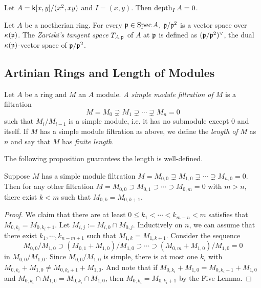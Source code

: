\begin{example}
    Let $A = {\mathsf{k}}[x,y]/(x^2,xy)$ and $I = (x,y)$.
    Then $\operatorname{depth}_I A = 0$.
\end{example}

\begin{definition}\label{def: Zariski's tangent space}
    Let \(A\) be a noetherian ring.
    For every ${\mathfrak{p}} \in \operatorname{Spec} A$, \({\mathfrak{p}}/{\mathfrak{p}}^2\) is a vector space over \({\kappa}({\mathfrak{p}})\).
    The \emph{Zariski's tangent space} $T_{A,{\mathfrak{p}}}$ of \(A\) at \({\mathfrak{p}}\) is defined as \(({\mathfrak{p}}/{\mathfrak{p}}^2)^\lor\), the dual \({\kappa}({\mathfrak{p}})\)-vector space of \({\mathfrak{p}}/{\mathfrak{p}}^2\).
\end{definition}

\subsection{Artinian Rings and Length of Modules}

    \begin{definition}\label{def: length of a module}
        Let $A$ be a ring and $M$ an $A$ module.
        \textit{A simple module filtration of $M$} is a filtration
        \[ M = M_0 \supsetneq M_1 \supsetneq \cdots \supsetneq M_n = 0 \] 
        such that $M_i/M_{i-1}$ is a simple module, i.e. it has no submodule except $0$ and itself.
        If $M$ has a simple module filtration as above, we define the \textit{length of $M$} as $n$ and say that $M$ has \textit{finite length}.
    \end{definition}

    The following proposition guarantees the length is well-defined.

    \begin{proposition}\label{prop: length of a module is well defined}
        Suppose $M$ has a simple module filtration $M = M_{0,0} \supsetneq M_{1,0} \supsetneq \cdots \supsetneq M_{n,0} = 0$.
        Then for any other filtration $M = M_{0,0} \supset M_{0,1} \supset \cdots \supset M_{0,m} = 0$ with $m > n$, there exist $k<m$ such that $M_{0,k} = M_{0,k+1}$.
    \end{proposition}
    \begin{proof}
        We claim that there are at least $0\leq k_1<\cdots<k_{m-n}<m$ satisfies that $M_{0,k_i} = M_{0,k_i+1}$.
        Let $M_{i,j} := M_{i,0} \cap M_{0,j}$.
        Inductively on $n$, we can assume that there exist $k_1,\cdots,k_{n-m+1}$ such that $M_{1,k} = M_{1,k+1}$.
        Consider the sequence 
        \[ M_{0,0}/M_{1,0} \supset (M_{0,1}+M_{1,0})/M_{1,0} \supset \cdots \supset (M_{0,m}+M_{1,0})/M_{1,0} = 0 \]
        in $M_{0,0}/M_{1,0}$.
        Since $M_{0,0}/M_{1,0}$ is simple, there is at most one $k_i$ with $M_{0,k_i}+M_{1,0} \neq M_{0,k_i+1}+M_{1,0}$.
        And note that if $M_{0,k_i} + M_{1,0} = M_{0,k_i+1}+M_{1,0}$ and $M_{0,k_i} \cap M_{1,0} = M_{0,k_i} \cap M_{1,0}$, then $M_{0,k_i} = M_{0,k_i+1}$ by the Five Lemma.
    \end{proof}

